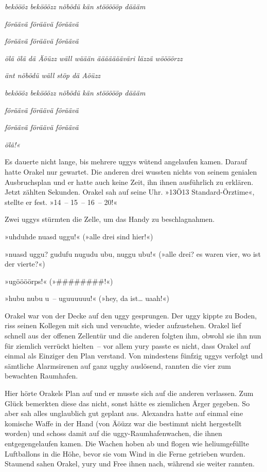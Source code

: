 \textit{beköööz bekööözz nöbödü kän stöööööp däääm}

\textit{föräävä föräävä föräävä}

\textit{föräävä föräävä föräävä}

\textit{ölä ölä dä Äöüzz wäll wäään äääääääväri läzzä wöööörzz}

\textit{änt nöbödü wäll stöp dä Aöüzz}

\textit{beköööz bekööözz nöbödü kän stöööööp däääm}

\textit{föräävä föräävä föräävä}

\textit{föräävä föräävä föräävä}

\textit{ölä!«}

Es dauerte nicht lange, bis mehrere uggys wütend angelaufen kamen. Darauf hatte Orakel nur gewartet. Die anderen drei wussten nichts von seinem genialen Ausbruchsplan und er hatte auch keine Zeit, ihn ihnen ausführlich zu erklären. Jetzt zählten Sekunden. Orakel sah auf seine Uhr. »13Ö13 Standard-Örztime«, stellte er fest. »14~– 15~– 16~– 20!«

Zwei uggys stürmten die Zelle, um das Handy zu beschlagnahmen.

»uhduhde nuasd uggu!« (»alle drei sind hier!«)

»nuasd uggu? gudufu nugudu ubu, nuggu ubu!« (»alle drei? es waren vier, wo ist der vierte?«)

»ugöööörps!« (»\#\#\#\#\#\#\#\#!«)

»hubu nubu u~– uguuuuuu!« (»hey, da ist… uaah!«)

Orakel war von der Decke auf den uggy gesprungen. Der uggy kippte zu Boden, riss seinen Kollegen mit sich und versuchte, wieder aufzustehen. Orakel lief schnell aus der offenen Zellentür und die anderen folgten ihm, obwohl sie ihn nun für ziemlich verrückt hielten~– vor allem yury passte es nicht, dass Orakel auf einmal als Einziger den Plan verstand. Von mindestens fünfzig uggys verfolgt und sämtliche Alarmsirenen auf ganz ugghy auslösend, rannten die vier zum bewachten Raumhafen.

Hier hörte Orakels Plan auf und er musste sich auf die anderen verlassen. Zum Glück bemerkten diese das nicht, sonst hätte es ziemlichen Ärger gegeben. So aber sah alles unglaublich gut geplant aus. Alexandra hatte auf einmal eine komische Waffe in der Hand (von Äöüzz war die bestimmt nicht hergestellt worden) und schoss damit auf die uggy-Raumhafenwachen, die ihnen entgegengelaufen kamen. Die Wachen hoben ab und flogen wie heliumgefüllte Luftballons in die Höhe, bevor sie vom Wind in die Ferne getrieben wurden. Staunend sahen Orakel, yury und Free ihnen nach, während sie weiter rannten.

